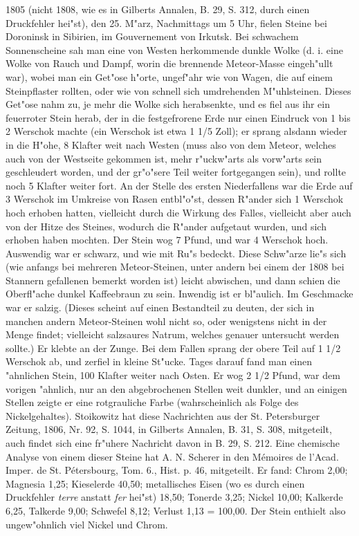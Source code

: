 \documentclass[a4paper, 11pt, oneside, polutonikogreek, german]{article}
\begin{document}
1805 (nicht 1808, wie es in Gilberts Annalen, B. 29, S. 312, durch einen Druckfehler hei"st), den 25. M"arz, Nachmittags um 5 Uhr, fielen Steine bei Doroninsk in Sibirien, im Gouvernement von Irkutsk. Bei schwachem Sonnenscheine sah man eine von Westen herkommende dunkle Wolke (d. i. eine Wolke von Rauch und Dampf, worin die brennende Meteor-Masse eingeh"ullt war), wobei man ein Get"ose h"orte, ungef"ahr wie von Wagen, die auf einem Steinpflaster rollten, oder wie von schnell sich umdrehenden M"uhlsteinen. Dieses Get"ose nahm zu, je mehr die Wolke sich herabsenkte, und es fiel aus ihr ein feuerroter Stein herab, der in die festgefrorene Erde nur einen Eindruck von 1 bis 2 Werschok machte (ein Werschok ist etwa 1 1/5 Zoll); er sprang alsdann wieder in die H"ohe, 8 Klafter weit nach Westen (muss also von dem Meteor, welches auch von der Westseite gekommen ist, mehr r"uckw"arts als vorw"arts sein geschleudert worden, und der gr"o"sere Teil weiter fortgegangen sein), und rollte noch 5 Klafter weiter fort. An der Stelle des ersten Niederfallens war die Erde auf 3 Werschok im Umkreise von Rasen entbl"o"st, dessen R"ander sich 1 Werschok hoch erhoben hatten, vielleicht durch die Wirkung des Falles, vielleicht aber auch von der Hitze des Steines, wodurch die R"ander aufgetaut wurden, und sich erhoben haben mochten. Der Stein wog 7 Pfund, und war 4 Werschok hoch. Auswendig war er schwarz, und wie mit Ru"s bedeckt. Diese Schw"arze lie"s sich (wie anfangs bei mehreren Meteor-Steinen, unter andern bei einem der 1808 bei Stannern gefallenen bemerkt worden ist) leicht abwischen, und dann schien die Oberfl"ache dunkel Kaffeebraun zu sein. Inwendig ist er bl"aulich. Im Geschmacke war er salzig. (Dieses scheint auf einen Bestandteil zu deuten, der sich in manchen andern Meteor-Steinen wohl nicht so, oder wenigstens nicht in der Menge findet; vielleicht salzsaures Natrum, welches genauer untersucht werden sollte.) Er klebte an der Zunge. Bei dem Fallen sprang der obere Teil auf 1 1/2 Werschok ab, und zerfiel in kleine St"ucke. Tages darauf fand man einen "ahnlichen Stein, 100 Klafter weiter nach Osten. Er wog 2 1/2 Pfund, war dem vorigen "ahnlich, nur an den abgebrochenen Stellen weit dunkler, und an einigen Stellen zeigte er eine rotgrauliche Farbe (wahrscheinlich als Folge des Nickelgehaltes). Stoikowitz hat diese Nachrichten aus der St. Petersburger Zeitung, 1806, Nr. 92, S. 1044, in Gilberts Annalen, B. 31, S. 308, mitgeteilt, auch findet sich eine fr"uhere Nachricht davon in B. 29, S. 212. Eine chemische Analyse von einem dieser Steine hat A. N. Scherer in den Mémoires de l'Acad. Imper. de St. Pétersbourg, Tom. 6., Hist. p. 46, mitgeteilt. Er fand: Chrom 2,00; Magnesia 1,25; Kieselerde 40,50; metallisches Eisen (wo es durch einen Druckfehler \emph{terre} anstatt \emph{fer} hei"st) 18,50; Tonerde 3,25; Nickel 10,00; Kalkerde 6,25, Talkerde 9,00; Schwefel 8,12; Verlust 1,13 = 100,00. Der Stein enthielt also ungew"ohnlich viel Nickel und Chrom.
\end{document}
